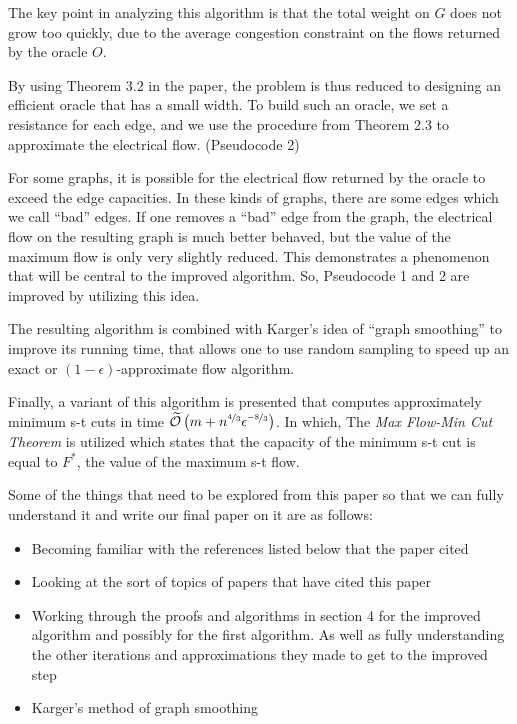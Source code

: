 \documentclass{article}
\begin{document}
The key point in analyzing this algorithm is that the total weight on $G$ does not grow too quickly, due to the average congestion constraint on the flows returned by the oracle $O$. 

By using Theorem 3.2 in the paper, the problem is thus reduced to designing an efficient oracle that has a small width. To build such an oracle, we set a resistance for each edge, and we use the procedure from Theorem 2.3 to approximate the electrical flow. (Pseudocode 2)

For some graphs, it is possible for the electrical flow returned by the oracle to exceed the edge capacities. In these kinds of graphs, there are some edges which we call “bad” edges. If one removes a “bad” edge from the graph, the electrical flow on the resulting graph is much better behaved, but the value of the maximum flow is only very slightly reduced. This demonstrates a phenomenon that will be central to the improved algorithm. So, Pseudocode 1 and 2 are improved by utilizing this idea.

The resulting algorithm is combined with Karger’s idea of “graph smoothing” to improve its running time, that allows one to use random sampling to speed up an exact or $(1 - \epsilon)$-approximate flow algorithm.

Finally, a variant of this algorithm is presented that computes approximately minimum s-t cuts in time $\widetilde{\mathcal{O}}\left( m + n^{\unitfrac{4}{3}} \epsilon^{\unitfrac{-8}{3}} \right)$. In which, The {\em Max Flow-Min Cut Theorem} \cite{Daitch, Fleischer} is utilized which states that the capacity of the minimum s-t cut is equal to $F^{*}$, the value of the maximum s-t flow.

Some of the things that need to be explored from this paper so that we can fully understand it and write our final paper on it are as follows:

\begin{itemize}
\item Becoming familiar with the references listed below that the paper cited
\item Looking at the sort of topics of papers that have cited this paper
\item Working through the proofs and algorithms in section 4 for the improved algorithm and possibly for the first algorithm. As well as fully understanding the other iterations and approximations they made to get to the improved step
\item Karger’s method of graph smoothing
\end{itemize}
\end{document}
